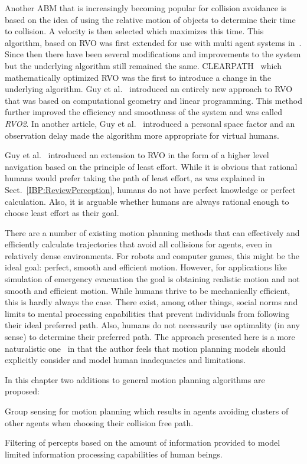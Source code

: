 Another ABM that is increasingly becoming popular for collision avoidance is based on the idea of using the relative motion of objects to determine their time to collision. A velocity is then selected which maximizes this time. This algorithm, based on RVO was first extended for use with multi agent systems in~\cite{vandenBerg:2008cq}. Since then there have been several modifications and improvements to the system but the underlying algorithm still remained the same. CLEARPATH~\cite{Guy:2009gu} which mathematically optimized RVO was the first to introduce a change in the underlying algorithm. Guy et al.~\cite{Guy:2010ko} introduced an entirely new approach to RVO that was based on computational geometry and linear programming. This method further improved the efficiency and smoothness of the system and was called \emph{RVO2}. In another article, Guy et al.~\cite{Guy:2010uv} introduced a personal space factor and an observation delay made the algorithm more appropriate for virtual humans.

Guy et al.~\cite{Guy:2010uv} introduced an extension to RVO in the form of a higher level navigation based on the principle of least effort. While it is obvious that rational humans would prefer taking the path of least effort, as was explained in Sect.~\ref{IBP:ReviewPerception}, humans do not have perfect knowledge or perfect calculation. Also, it is arguable whether humans are always rational enough to choose least effort as their goal.

There are a number of existing motion planning methods that can effectively and efficiently calculate trajectories that avoid all collisions for agents, even in relatively dense environments. For robots and computer games, this might be the ideal goal: perfect, smooth and efficient motion. However, for applications like simulation of emergency evacuation the goal is obtaining realistic motion and not smooth and efficient motion. While humans thrive to be mechanically efficient, this is hardly always the case. There exist, among other things, social norms and limits to mental processing capabilities that prevent individuals from following their ideal preferred path. Also, humans do not necessarily use optimality (in any sense) to determine their preferred path. The approach presented here is a more naturalistic one~\cite{Klein:2009} in that the author feels that motion planning models should explicitly consider and model human inadequacies and limitations.

In this chapter two additions to general motion planning algorithms are proposed:
\begin{inparaenum}
\item Group sensing for motion planning which results in agents avoiding clusters of other agents when choosing their collision free path.
\item Filtering of percepts based on the amount of information provided to model limited information processing capabilities of human beings.
\end{inparaenum}

